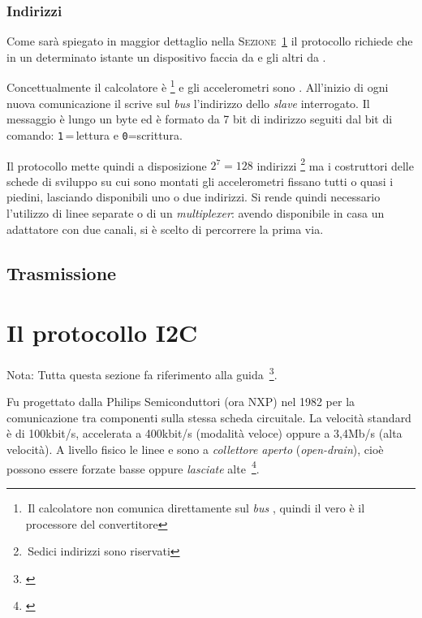     
	\subsubsection {Indirizzi} \label{sssez:indirizzi}
    Come sarà spiegato in maggior dettaglio nella \textsc{Sezione~\ref{sez:protocollo_i2c}}
    il protocollo {\iic} richiede che in un determinato istante
    un dispositivo faccia da {\master} e gli altri da {\slave}.
    
    Concettualmente il calcolatore è {\master}
    \footnote{\,Il calcolatore non comunica direttamente sul \textit{bus} {\iic},
    quindi il vero {\master} è il processore del convertitore}
    e gli accelerometri sono {\slave}.
    All'inizio di ogni nuova comunicazione il \master{}
    scrive sul \textit{bus} l'indirizzo dello \textit{slave} interrogato.
    Il messaggio è lungo un byte ed è formato da 7 bit di indirizzo
    seguiti dal bit di comando: \texttt{1}\,=\,lettura e \texttt{0}=scrittura.
    
Il protocollo \iic{} mette quindi a disposizione
    \(2^7=128\) indirizzi \footnote{\,Sedici indirizzi sono riservati}
    ma i costruttori delle schede di sviluppo su cui sono montati gli accelerometri
    fissano tutti o quasi i piedini, lasciando disponibili uno o due indirizzi.
    Si rende quindi necessario l'utilizzo di linee separate o di un \textit{multiplexer}: avendo disponibile in casa un adattatore con due canali,
    si è scelto di percorrere la prima via.








\subsection{Trasmissione}
\label{ssez:trasmissione}

\section{Il protocollo I2C} \label{sez:protocollo_i2c}
{Nota: Tutta questa sezione fa riferimento alla guida~\footnote{\cite{cit:primer}}.}

    Fu progettato dalla Philips Semiconduttori (ora NXP) nel 1982
    per la comunicazione tra componenti sulla stessa scheda circuitale.
    La velocità standard è di 100kbit/s,
    accelerata a 400kbit/s (modalità veloce)
    oppure a 3,4Mb/s (alta velocità).
    A livello fisico le linee \sda{} e \scl{} sono a \emph{collettore aperto}
    (\textit{open-drain}),
    cioè possono essere forzate basse oppure \emph{lasciate} alte~\footnote{\cite{cit:primer}}.
	

